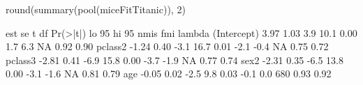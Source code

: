 \begin{Schunk}
\begin{Sinput}
 round(summary(pool(miceFitTitanic)), 2)
\end{Sinput}
\begin{Soutput}
              est   se    t   df Pr(>|t|) lo 95 hi 95 nmis  fmi lambda
(Intercept)  3.97 1.03  3.9 10.1     0.00   1.7   6.3   NA 0.92   0.90
pclass2     -1.24 0.40 -3.1 16.7     0.01  -2.1  -0.4   NA 0.75   0.72
pclass3     -2.81 0.41 -6.9 15.8     0.00  -3.7  -1.9   NA 0.77   0.74
sex2        -2.31 0.35 -6.5 13.8     0.00  -3.1  -1.6   NA 0.81   0.79
age         -0.05 0.02 -2.5  9.8     0.03  -0.1   0.0  680 0.93   0.92
\end{Soutput}
\end{Schunk}
